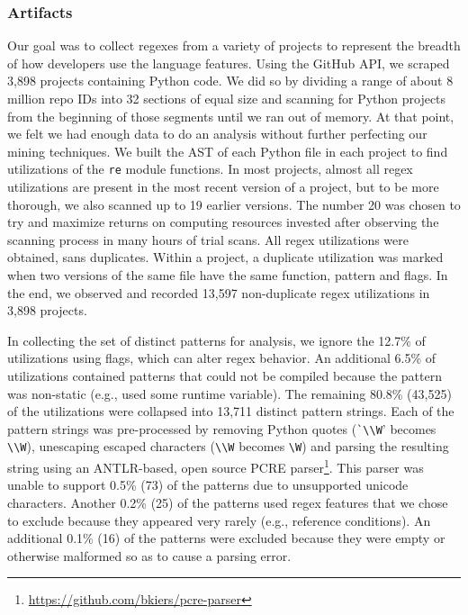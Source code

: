 \subsubsection{Artifacts}
Our goal was to collect regexes from a variety of projects to represent the breadth of how developers use the language features. 
Using the GitHub API, we scraped 3,898 projects containing Python code.
We did so  by dividing a range of about 8 million repo IDs 
into 32 sections of equal size and scanning  for Python projects from the beginning of those
segments until we ran out of memory. At that point, we felt we had enough data
to do an analysis without further perfecting our mining techniques. We built
the AST of each Python file in each project to find utilizations of the {\tt re} module
functions. In most projects, almost all regex utilizations are present in the
most recent version of a project, but to be more thorough, we also scanned up
to 19 earlier versions. The number 20 was chosen to try and maximize returns on
computing resources invested after observing the scanning process in many hours
of trial scans.
All regex utilizations were obtained, sans duplicates. Within a project, a duplicate utilization was marked when two versions of the same file have the same function, pattern and flags.  In the end, we observed and recorded 13,597 non-duplicate regex utilizations in 3,898 projects.

In collecting the set of distinct patterns for analysis,  we ignore the 12.7\%  of utilizations using flags, which can alter regex behavior.  An additional 6.5\% of utilizations contained patterns that could not be compiled because the pattern was non-static (e.g., used some runtime variable).
The remaining 80.8\% (43,525) of the utilizations were collapsed into 13,711 distinct pattern strings.  Each of the pattern strings was pre-processed by removing Python quotes (\verb!`\\W!' becomes \verb!\\W!), unescaping escaped characters (\verb!\\W! becomes \verb!\W!) and parsing the resulting  string using an ANTLR-based, open source PCRE parser\footnote{\url{https://github.com/bkiers/pcre-parser}}.
This parser was unable to support 0.5\% (73) of the patterns due to unsupported unicode characters.  Another 0.2\% (25) of the patterns used regex features that we  chose to exclude because they appeared very rarely (e.g., reference conditions).  An additional 0.1\% (16) of the patterns were excluded because they were empty or otherwise malformed so as to cause a parsing error.


